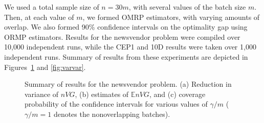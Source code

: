 \documentclass[11pt]{article}
\newcommand{\e}[1]{\mathbb{E} %
#1 %
}
\begin{document}
We used a total sample size of $n = 30 m$, with several values of the batch size $m$. 
Then, at each value of $m$, we formed OMRP estimators, with varying amounts of overlap. 
We also formed 90\% confidence intervals on the optimality gap using ORMP estimators. 
Results for the newsvendor problem were compiled over 10,000 independent runs, while the CEP1 and 10D results were taken over 1,000 independent runs.  
Summary of results from these experiments are depicted in Figures~\ref{fig:nv} and \ref{fig:varvar}.

\begin{figure}[htb!]
	\centering
	\caption{
		Summary of results for the newsvendor problem. 
		(a) Reduction in variance of $nVG$,
		(b) estimates of $\e{nVG}$, and 
		(c) coverage probability of the confidence intervals for various values of $\gamma/m$ ($\gamma/m=1$ denotes the nonoverlapping batches).
	}
\label{fig:nv}
\end{figure}
\end{document}
